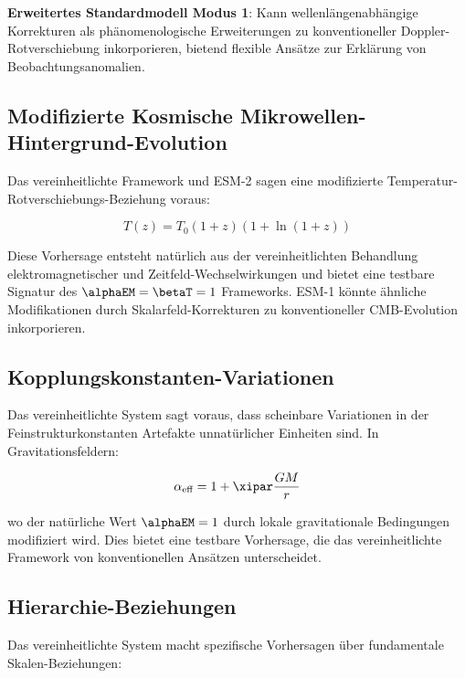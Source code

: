 	\textbf{Erweitertes Standardmodell Modus 1}: Kann wellenlängenabhängige Korrekturen als phänomenologische Erweiterungen zu konventioneller Doppler-Rotverschiebung inkorporieren, bietend flexible Ansätze zur Erklärung von Beobachtungsanomalien.
	
	\subsection{Modifizierte Kosmische Mikrowellen-Hintergrund-Evolution}
	\label{subsec:cmb_evolution}
	
	Das vereinheitlichte Framework und ESM-2 sagen eine modifizierte Temperatur-Rotverschiebungs-Beziehung voraus:
	
	\begin{equation}
		T(z) = T_0(1+z)(1+\ln(1+z))
	\end{equation}
	
	Diese Vorhersage entsteht natürlich aus der vereinheitlichten Behandlung elektromagnetischer und Zeitfeld-Wechselwirkungen und bietet eine testbare Signatur des $\alphaEM = \betaT = 1$ Frameworks. ESM-1 könnte ähnliche Modifikationen durch Skalarfeld-Korrekturen zu konventioneller CMB-Evolution inkorporieren.
	
	\subsection{Kopplungskonstanten-Variationen}
	\label{subsec:coupling_variations}
	
	Das vereinheitlichte System sagt voraus, dass scheinbare Variationen in der Feinstrukturkonstanten Artefakte unnatürlicher Einheiten sind. In Gravitationsfeldern:
	
	\begin{equation}
		\alpha_{\text{eff}} = 1 + \xipar \frac{GM}{r}
	\end{equation}
	
	wo der natürliche Wert $\alphaEM = 1$ durch lokale gravitationale Bedingungen modifiziert wird. Dies bietet eine testbare Vorhersage, die das vereinheitlichte Framework von konventionellen Ansätzen unterscheidet.
	
	\subsection{Hierarchie-Beziehungen}
	\label{subsec:hierarchy_relationships}
	
	Das vereinheitlichte System macht spezifische Vorhersagen über fundamentale Skalen-Beziehungen:
	
